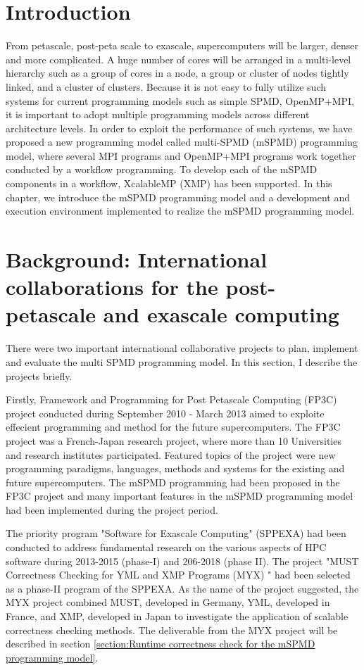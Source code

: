 \documentclass[graybox]{svmult}
\begin{document}
\section{Introduction}

From petascale, post-peta scale to exascale, supercomputers will be larger, denser and more complicated. A huge number of cores will be arranged in a multi-level hierarchy such as a group of cores in a node, a group or cluster of nodes tightly linked, and a cluster of clusters. Because it is not easy to fully utilize such systems for current programming models such as simple SPMD, OpenMP+MPI, it is important to adopt multiple programming models across different architecture levels. In order to exploit the performance of such systems, we have proposed a new programming model called multi-SPMD (mSPMD) programming model, where several MPI programs and OpenMP+MPI programs work together conducted by a workflow programming\cite{tsuji2013c}. To develop each of the mSPMD components in a workflow, XcalableMP (XMP) has been supported. In this chapter, we introduce the mSPMD programming model and a development and execution environment implemented to realize the mSPMD programming model.

\section{Background: International collaborations for the post-petascale and exascale computing}

There were two important international collaborative projects to plan, implement and evaluate the multi SPMD programming model. In this section, I describe the projects briefly.

Firstly,  Framework and Programming for Post Petascale Computing (FP3C)  project conducted during September 2010 - March 2013 aimed to exploite effecient programming and method for the future supercomputers. The FP3C project was a French-Japan research project, where more than 10 Universities and research institutes participated. Featured topics of the project were new programming paradigms, languages, methods and systems for the existing and future supercomputers.   The mSPMD programming had been proposed in the FP3C project and many important features in the mSPMD programming model had been implemented during the project period.

The  priority program "Software for Exascale Computing" (SPPEXA) had been conducted to address fundamental research on the various aspects of HPC software during 2013-2015 (phase-I) and 206-2018 (phase II). The project "MUST Correctness Checking for YML and XMP Programs (MYX) " had been selected as a phase-II program of the SPPEXA. As the name of the project suggested, the MYX project combined MUST, developed in Germany, YML, developed in France, and XMP, developed in Japan to investigate the application of scalable correctness checking methods.
The deliverable from the MYX project will be described in section \ref{section:Runtime correctness check for the mSPMD programming model}.
\end{document}
